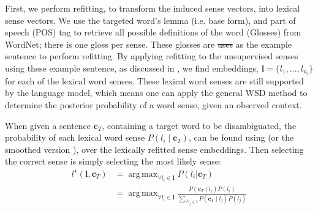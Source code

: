 \documentclass{sig-alternate}
\renewcommand{\c}{\mathbf{c}}
\renewcommand{\l}{\mathbf{l}}
\DeclareMathOperator*{\argmax}{arg\,max}
\providecommand{\DIFadd}[1]{{\protect\color{blue}\uwave{#1}}} %
\providecommand{\DIFdel}[1]{{\protect\color{red}\sout{#1}}}                      %
\providecommand{\DIFaddbegin}{} %
\providecommand{\DIFaddend}{} %
\providecommand{\DIFdelbegin}{} %
\providecommand{\DIFdelend}{} %
\begin{document}
First, we perform refitting, to transform the induced sense vectors, into lexical sense vectors.
We use the targeted word's lemma (i.e. base form), and part of speech (POS) tag to retrieve all possible definitions of the word (Glosses) from WordNet; there is one gloss per sense. These glosses are \DIFdelbegin \DIFdel{uses }\DIFdelend \DIFaddbegin \DIFadd{used }\DIFaddend as the example sentence to perform refitting. By applying refitting to the unsupervised senses using these example sentence, as discussed in , we find embeddings, $\l=\{l_1,..., l_{n_l}\}$ for each of the lexical word senses. These lexical word senses are still supported by the language model, which means one can apply the general WSD method to determine the posterior probability of a word sense, given an observed context. 

When given a sentence $\c_{T}$, containing a target word to be disambiguated, 
the probability of each lexical word sense $P(l_i \mid \c_{T})$, can be found using  (or the smoothed version ), over the lexically refitted sense embeddings. Then selecting the correct sense is simply selecting the most likely sense:
\begin{equation}
\begin{aligned}\label{eq:lexicalwsd}
l^\star (\l, \c_T) &= \argmax_{\forall l_i \in \l} P(l_i|\c_T) \\
&= \argmax_{\forall l_i \in \l} \frac{P(\c_T \mid l_i)P(l_i)}{\sum_{\forall l_j \in \l} P(\c_T \mid l_j)P(l_j)}
\end{aligned}
\end{equation}
\end{document}
